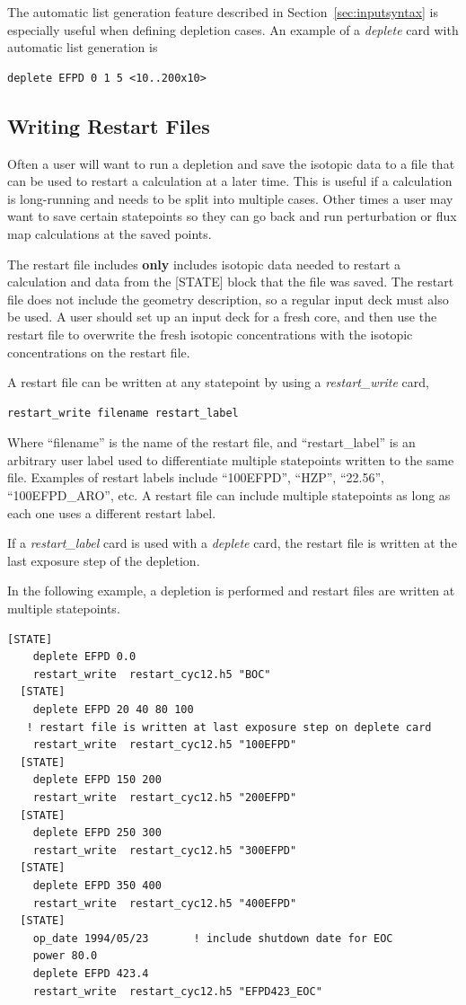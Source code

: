 The automatic list generation feature described in Section~\ref{sec:inputsyntax} is especially
useful when defining depletion cases.  An example of a {\it deplete} card with automatic list
generation is
\begin{Verbatim}[fontsize=\small]
  deplete EFPD 0 1 5 <10..200x10>
\end{Verbatim}

\subsection{Writing Restart Files}

Often a user will want to run a depletion and save the isotopic data to a file that can be used to
restart a calculation at a later time.  This is useful if a calculation is long-running and needs to be
split into multiple cases.  Other times a user may want to save certain statepoints so they can go
back and run perturbation or flux map calculations at the saved points.

The restart file includes {\bf only} includes isotopic data needed to restart a calculation and
data from the [STATE] block that the file was saved.
The restart file does not include the geometry description, so a regular input deck must also be used.
A user should set up an input deck for a fresh core, and then use the restart file to
overwrite the fresh isotopic concentrations with the isotopic concentrations on the restart file.

A restart file can be written at any statepoint by using a {\it restart\_write} card,
\begin{Verbatim}[fontsize=\small]
  restart_write filename restart_label
\end{Verbatim}
Where ``filename'' is the name of the restart file, and ``restart\_label'' is an arbitrary user label used
to differentiate multiple statepoints written to the same file.  Examples of restart labels
include ``100EFPD'', ``HZP'', ``22.56'', ``100EFPD\_ARO'', etc.
A restart file can include multiple statepoints as long as each one uses a different restart label.

If a {\it restart\_label} card is used with a {\it deplete} card, the restart file is written at the last
exposure step of the depletion.

In the following example, a depletion is performed and restart files are written at multiple statepoints.
\begin{Verbatim}[fontsize=\small]
  [STATE]
    deplete EFPD 0.0
    restart_write  restart_cyc12.h5 "BOC"
  [STATE]
    deplete EFPD 20 40 80 100
   ! restart file is written at last exposure step on deplete card
    restart_write  restart_cyc12.h5 "100EFPD"
  [STATE]
    deplete EFPD 150 200
    restart_write  restart_cyc12.h5 "200EFPD"
  [STATE]
    deplete EFPD 250 300
    restart_write  restart_cyc12.h5 "300EFPD"
  [STATE]
    deplete EFPD 350 400
    restart_write  restart_cyc12.h5 "400EFPD"
  [STATE]
    op_date 1994/05/23       ! include shutdown date for EOC
    power 80.0
    deplete EFPD 423.4
    restart_write  restart_cyc12.h5 "EFPD423_EOC"
\end{Verbatim}

